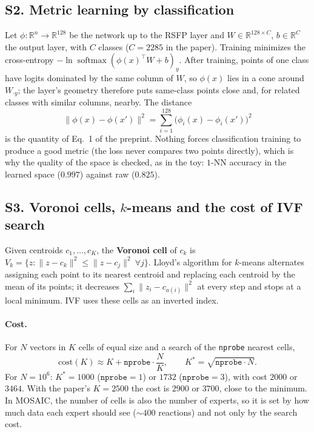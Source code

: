 \documentclass[11pt]{article}
\newcommand{\R}{\mathbb{R}}
\DeclareMathOperator{\softmax}{softmax}
\begin{document}
\label{sec:S2}
\subsection*{S2. Metric learning by classification}
Let $\phi:\R^{n}\to\R^{128}$ be the network up to the RSFP layer and $W\in\R^{128\times C}$, $b\in\R^C$ the output layer, with $C$ classes ($C=2285$ in the paper). Training minimizes the cross-entropy $-\ln\softmax(\phi(x)^{\!\top}W+b)_y$. After training, points of one class have logits dominated by the same column of $W$, so $\phi(x)$ lies in a cone around $W_{\cdot y}$; the layer's geometry therefore puts same-class points close and, for related classes with similar columns, nearby. The distance
\[
  \lVert\phi(x)-\phi(x')\rVert^2=\sum_{i=1}^{128}\big(\phi_i(x)-\phi_i(x')\big)^2
\]
is the quantity of Eq.~1 of the preprint. Nothing forces classification training to produce a good metric (the loss never compares two points directly), which is why the quality of the space is checked, as in the toy: $1$-NN accuracy in the learned space ($0.997$) against raw ($0.825$).

\label{sec:S3}
\subsection*{S3. Voronoi cells, $k$-means and the cost of IVF search}
Given centroids $c_1,\dots,c_K$, the \textbf{Voronoi cell} of $c_k$ is $V_k=\{z:\lVert z-c_k\rVert^2\le\lVert z-c_j\rVert^2\ \forall j\}$. Lloyd's algorithm for $k$-means alternates assigning each point to its nearest centroid and replacing each centroid by the mean of its points; it decreases $\sum_i\lVert z_i-c_{a(i)}\rVert^2$ at every step and stops at a local minimum. IVF uses these cells as an inverted index.

\paragraph{Cost.} For $N$ vectors in $K$ cells of equal size and a search of the \texttt{nprobe} nearest cells,
\[
  \text{cost}(K)\approx K+\texttt{nprobe}\cdot\frac NK,\qquad K^\ast=\sqrt{\texttt{nprobe}\cdot N}.
\]
For $N=10^6$: $K^\ast=1000$ ($\texttt{nprobe}=1$) or $1732$ ($\texttt{nprobe}=3$), with cost $2000$ or $3464$. With the paper's $K=2500$ the cost is $2900$ or $3700$, close to the minimum. In MOSAIC, the number of cells is also the number of experts, so it is set by how much data each expert should see ($\sim400$ reactions) and not only by the search cost.
\end{document}

